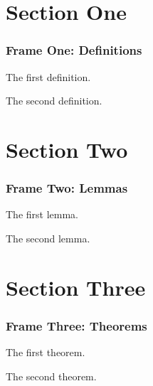 





\frame{\titlepage} 

\section{Section One}

\begin{frame}
\frametitle{Frame One: Definitions}

\begin{definition}
The first definition.
\end{definition}

\begin{definition}
The second definition.
\end{definition}

\end{frame}

\section{Section Two}

\begin{frame}
\frametitle{Frame Two: Lemmas}

\begin{lemma}
The first lemma.
\end{lemma}

\begin{lemma}
The second lemma.
\end{lemma}

\end{frame}

\section{Section Three}

\begin{frame}
\frametitle{Frame Three: Theorems}

\begin{theorem}
The first theorem.
\end{theorem}

\begin{theorem}
The second theorem.
\end{theorem}

\end{frame}



